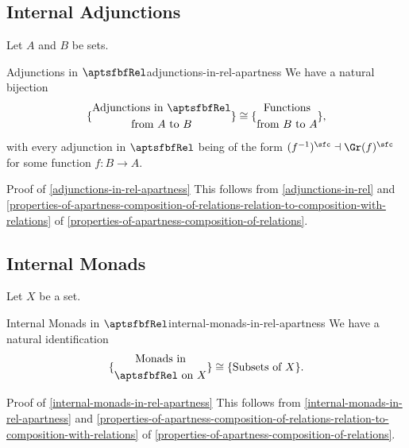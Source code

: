 \subsection{Internal Adjunctions}\label{subsection-internal-adjunctions-in-rel-apartness}
Let $A$ and $B$ be sets.
\begin{proposition}{Adjunctions in $\aptsfbfRel$}{adjunctions-in-rel-apartness}%
    We have a natural bijection
    \[
        \{
            \begin{gathered}
                \text{Adjunctions in $\aptsfbfRel$}\\
                \text{from $A$ to $B$}
            \end{gathered}
        \}%
        \cong
        \{
            \begin{gathered}
                \text{Functions}\\
                \text{from $B$ to $A$}
            \end{gathered}
        \},
    \]%
    with every adjunction in $\aptsfbfRel$ being of the form $(f^{-1})^{\sfc}\dashv\Gr(f)^{\sfc}$ for some function $f\colon B\to A$.
\end{proposition}
\begin{Proof}{Proof of \cref{adjunctions-in-rel-apartness}}%
    This follows from \cref{adjunctions-in-rel} and \cref{properties-of-apartness-composition-of-relations-relation-to-composition-with-relations} of \cref{properties-of-apartness-composition-of-relations}.
\end{Proof}
\subsection{Internal Monads}\label{subsection-internal-monads-in-rel-apartness}
Let $X$ be a set.
\begin{proposition}{Internal Monads in $\aptsfbfRel$}{internal-monads-in-rel-apartness}%
    We have a natural identification%
    \[
        \{
            \begin{gathered}
                \text{Monads in}\\
                \text{$\aptsfbfRel$ on $X$}
            \end{gathered}
        \}
        \cong
        \{\text{Subsets of $X$}\}.
    \]%
\end{proposition}
\begin{Proof}{Proof of \cref{internal-monads-in-rel-apartness}}%
    This follows from \cref{internal-monads-in-rel-apartness} and \cref{properties-of-apartness-composition-of-relations-relation-to-composition-with-relations} of \cref{properties-of-apartness-composition-of-relations}.
\end{Proof}
